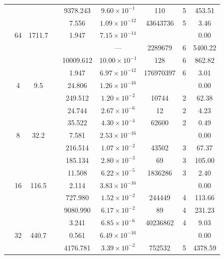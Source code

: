 \begin{table}[htbp]
\begin{tabular}{l S[table-format=3.0] S[table-format=4.1] l S[table-format=3.3] S[table-format=1.2e2] S[table-format=6.0] S[table-format=2.0] S[table-format=4.2]}
     &  &  &  & 9378.243 & $9.60 \times 10^{-1}$ & 110 & 5 & 453.51 \\
     &  &  &  & 7.556 & $1.09 \times 10^{-12}$ & 43643736 & 5 & 3.46 \\
     & 64 & 1711.7 &  & 1.947 & $7.15 \times 10^{-14}$ & {\text{---}} & {\text{---}} & 0.00 \\
     &  &  &  & {\text{---}} & ${\text{---}}$ & 2289679 & 6 & 5400.22 \\
     &  &  &  & 10009.612 & $10.00 \times 10^{-1}$ & 128 & 6 & 862.82 \\
     &  &  &  & 1.947 & $6.97 \times 10^{-12}$ & 176970397 & 6 & 3.01 \\
    \midrule
     & 4 & 9.5 &  & 24.806 & $1.26 \times 10^{-16}$ & {\text{---}} & {\text{---}} & 0.00 \\
     &  &  &  & 249.512 & $1.20 \times 10^{-2}$ & 10744 & 2 & 62.38 \\
     &  &  &  & 24.744 & $2.67 \times 10^{-6}$ & 12 & 2 & 4.23 \\
     &  &  &  & 35.522 & $4.30 \times 10^{-4}$ & 62600 & 2 & 0.49 \\
     & 8 & 32.2 &  & 7.581 & $2.53 \times 10^{-16}$ & {\text{---}} & {\text{---}} & 0.00 \\
     &  &  &  & 216.514 & $1.07 \times 10^{-2}$ & 43502 & 3 & 67.37 \\
     &  &  &  & 185.134 & $2.80 \times 10^{-3}$ & 69 & 3 & 105.00 \\
     &  &  &  & 11.508 & $6.22 \times 10^{-5}$ & 1836286 & 3 & 2.40 \\
     & 16 & 116.5 &  & 2.114 & $3.83 \times 10^{-16}$ & {\text{---}} & {\text{---}} & 0.00 \\
     &  &  &  & 727.980 & $1.52 \times 10^{-2}$ & 244449 & 4 & 113.66 \\
     &  &  &  & 9080.990 & $6.17 \times 10^{-2}$ & 89 & 4 & 231.23 \\
     &  &  &  & 3.241 & $6.85 \times 10^{-6}$ & 40236862 & 4 & 9.03 \\
     & 32 & 440.7 &  & 0.561 & $6.49 \times 10^{-16}$ & {\text{---}} & {\text{---}} & 0.00 \\
     &  &  &  & 4176.781 & $3.39 \times 10^{-2}$ & 752532 & 5 & 4378.59 \\

\end{tabular}
\end{table}
